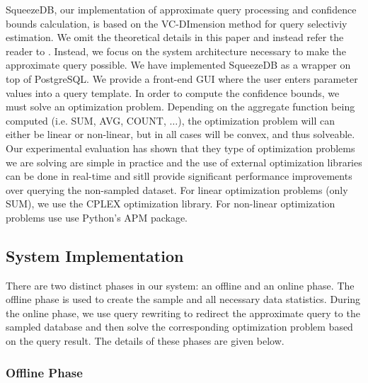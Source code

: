 \documentclass[11pt]{article}
\begin{document}
SqueezeDB, our implementation of approximate query processing and confidence
bounds calculation, is based on the VC-DImension method for query
selectiviy estimation. We omit the theoretical details in this paper
and instead refer the reader to \cite{Matteo}. Instead, we focus on
the system architecture necessary to make the approximate query
possible. We have implemented SqueezeDB as a wrapper on top of
PostgreSQL. We provide a front-end GUI where the user enters parameter
values into a query template. In order to compute the confidence
bounds, we must solve an optimization problem. Depending on the
aggregate function being computed (i.e. SUM, AVG, COUNT, $\ldots$),
the optimization problem will can either be linear or non-linear, but
in all cases will be convex, and thus solveable. Our experimental
evaluation has shown that they type of optimization problems we are
solving are simple in practice and the use of external optimization
libraries can be done in real-time and sitll provide significant
performance improvements over querying the non-sampled dataset. For
linear optimization problems (only SUM), we use the CPLEX optimization
library. For non-linear optimization problems use use Python's APM
package. 

\subsection{System Implementation}

There are two distinct phases in our system:  an offline and an online
phase. The offline phase is used to create the sample and all
necessary data statistics. During the online phase, we use query
rewriting to redirect the approximate query to the sampled database
and then solve the corresponding optimization problem based on the
query result. The details of these phases are given below.

\subsubsection{Offline Phase}
\end{document}
